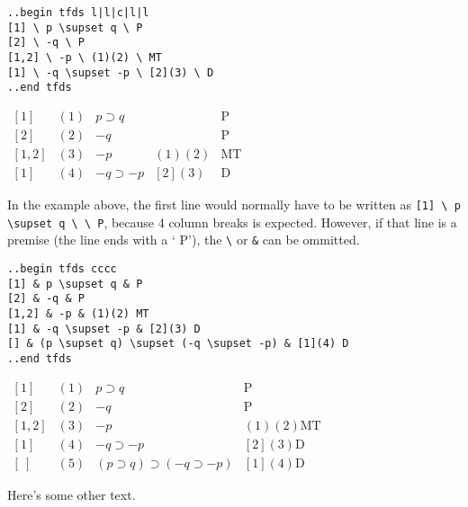 \documentclass[12pt]{article}
\newcommand{\nl}{\\}
\numberwithin{equation}{section}
\begin{document}
\begin{flushleft}

\verb=..begin tfds l|l|c|l|l=\nl
\verb=[1] \ p \supset q \ P=\nl
\verb=[2] \ -q \ P=\nl
\verb=[1,2] \ -p \ (1)(2) \ MT=\nl
\verb=[1] \ -q \supset -p \ [2](3) \ D=\nl
\verb=..end tfds=\nl
\bigskip

$\begin{array}{l|l|c|l|l}
{[1]} & (1) & p \supset q & & \text{P} \\
{[2]} & (2) & -q & & \text{P} \\
{[1,2]} & (3) & -p & (1)(2) & \text{MT} \\
{[1]} & (4) & -q \supset -p & [2](3) & \text{D} 
\end{array}$

\bigskip

In the example above, the first line would normally have to be written as \verb=[1] \ p \supset q \ \ P=, because 4 column breaks is expected. However, if that line is a premise (the line ends with a ` P'), the \verb|\| or \verb|&| can be ommitted.

\bigskip

\verb|..begin tfds cccc|\nl
\verb|[1] & p \supset q & P|\nl
\verb|[2] & -q & P|\nl
\verb|[1,2] & -p & (1)(2) MT|\nl
\verb|[1] & -q \supset -p & [2](3) D|\nl
\verb|[] & (p \supset q) \supset (-q \supset -p) & [1](4) D|\nl
\verb|..end tfds|\nl
\bigskip

$\begin{array}{cccc}
{[1]} & (1) & p \supset q & \text{P} \\
{[2]} & (2) & -q & \text{P} \\
{[1,2]} & (3) & -p & (1)(2) \text{MT} \\
{[1]} & (4) & -q \supset -p & [2](3) \text{D} \\
{[~]} & (5) & (p \supset q) \supset (-q \supset -p) & [1](4) \text{D} 
\end{array}$

\bigskip

Here's some other text.
\end{flushleft}
\end{document}
